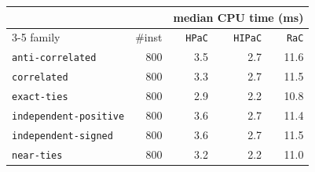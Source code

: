 \begin{tabular}{@{}lrrrr@{}}
\toprule
 &  & \multicolumn{3}{c}{median CPU time (ms)} \\
\cmidrule(l){3-5}
family & \#inst & \texttt{HPaC} & \texttt{HIPaC} & \texttt{RaC} \\
\midrule
\texttt{anti-correlated} & 800 & 3.5 & 2.7 & 11.6 \\
\texttt{correlated} & 800 & 3.3 & 2.7 & 11.5 \\
\texttt{exact-ties} & 800 & 2.9 & 2.2 & 10.8 \\
\texttt{independent-positive} & 800 & 3.6 & 2.7 & 11.4 \\
\texttt{independent-signed} & 800 & 3.6 & 2.7 & 11.5 \\
\texttt{near-ties} & 800 & 3.2 & 2.2 & 11.0 \\
\bottomrule
\end{tabular}

